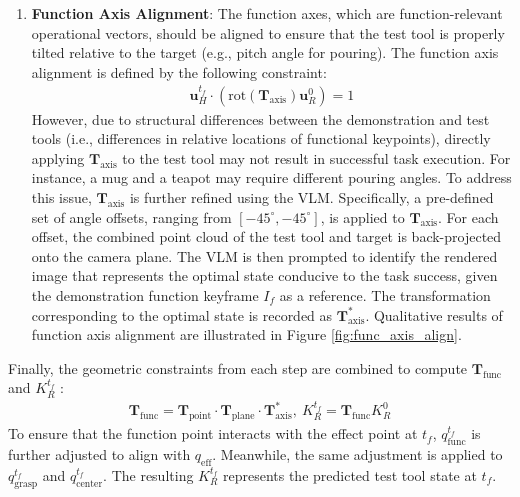 \begin{enumerate}[label=\arabic*., start=0]
    \item \textbf{Function Axis Alignment}: The function axes, which are function-relevant operational vectors, should be aligned to ensure that the test tool is properly tilted relative to the target (e.g., pitch angle for pouring). The function axis alignment is defined by the following constraint:
    \begin{align*}    
    \mathbf{u}_H^{t_f} \cdot (\text{rot}(\mathbf{T}_{\text{axis}}) \mathbf{u}_R^0) = 1
    \end{align*}
    However, due to structural differences between the demonstration and test tools  (i.e., differences in relative locations of functional keypoints), directly applying $\mathbf{T}_{\text{axis}}$ to the test tool may not result in successful task execution. For instance, a mug and a teapot may require different pouring angles. To address this issue, $\mathbf{T}_{\text{axis}}$ is further refined using the VLM. Specifically, a pre-defined set of angle offsets, ranging from $[-45^{\circ}, -45^{\circ}]$, is applied to $\mathbf{T}_{\text{axis}}$. For each offset, the combined point cloud of the test tool and target is back-projected onto the camera plane. The VLM is then prompted to identify the rendered image that represents the optimal state conducive to the task success, given the demonstration function keyframe $I_f$ as a reference. The transformation corresponding to the optimal state is recorded as  $\mathbf{T}^{*}_{\text{axis}}$. Qualitative results of function axis alignment are illustrated in Figure \ref{fig:func_axis_align}.
\end{enumerate}
Finally, the geometric constraints from each step are combined to compute  $\mathbf{T}_{\text{func}}$ and $K_R^{t_f}$ :
\begin{align*}
\mathbf{T}_{\text{func}} = \mathbf{T}_{\text{point}} \cdot \mathbf{T}_{\text{plane}} \cdot \mathbf{T}^{*}_{\text{axis}}, \
K_R^{t_f} = \mathbf{T}_{\text{func}} K_R^0
\end{align*}
To ensure that the function point interacts with the effect point at $t_f$, $q_{\text{func}}^{t_f}$ is further adjusted to align with  $q_{\text{eff}}$. Meanwhile, the same adjustment is applied to  $q_{\text{grasp}}^{t_f}$ and  $q_{\text{center}}^{t_f}$. The resulting $K_R^{t_f}$ represents the predicted test tool state at $t_f$.


